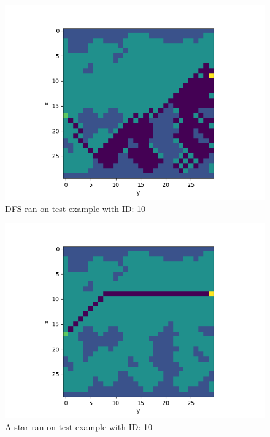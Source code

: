 \documentclass[letterpaper, 10 pt, conference]{ieeeconf}   %
\begin{document}
\begin{figure}[thpb]
	\centering
	\includegraphics[scale=0.5]{images/ID10DFS.png}
	\caption{DFS ran on test example with ID: 10}
	\label{figurelabel}
\end{figure}
\begin{figure}[thpb]
	\centering
	\includegraphics[scale=0.5]{images/ID10A.png}
	\caption{A-star ran on test example with ID: 10}
	\label{figurelabel}
\end{figure}
\end{document}
